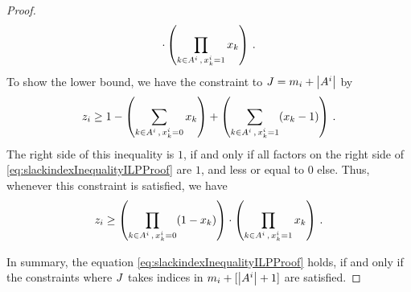 \begin{proof}
\begin{align*}
        \cdot \left( \prod_{k\in A^{i} \, , \,  x_{k}^i = 1}  x_{k} \right) \, .
    \end{align*}
    To show the lower bound, we have the constraint to $J=m_{i}+\left|A^{i}\right|$ by
    \begin{align*}
        z_{i} \geq 1 -
        \left( \sum_{k\in A^{i} \, , \,  x_{k}^i = 0} x_{k} \right)
        + \left( \sum_{k\in A^{i} \, , \,  x_{k}^i = 1}  (x_{k} - 1 )\right) \, .
    \end{align*}
    The right side of this inequality is $1$, if and only if all factors on the right side of \eqref{eq:slackindexInequalityILPProof} are $1$, and less or equal to $0$ else.
    Thus, whenever this constraint is satisfied, we have
    \begin{align*}
        z_{i}
        \geq \left( \prod_{k\in A^{i} \, , \,  x_{k}^i = 0} (1 - x_{k}) \right)
        \cdot \left( \prod_{k\in A^{i} \, , \,  x_{k}^i = 1}  x_{k} \right)  \, .
    \end{align*}

    In summary, the equation \eqref{eq:slackindexInequalityILPProof} holds, if and only if the constraints where $J$ takes indices in $m_{i}+[\left|A^{i}\right|+1]$ are satisfied.


\end{proof}
